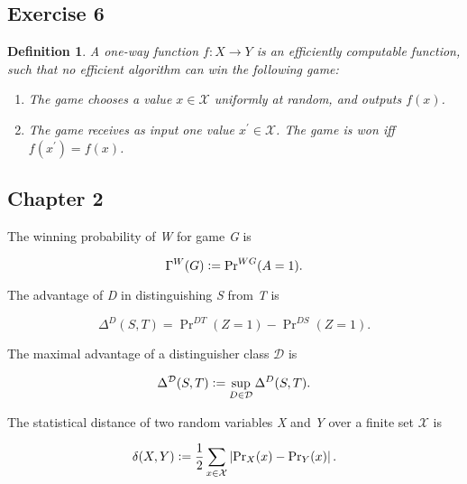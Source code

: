 \documentclass[a4paper,german]{article}
\newtheorem{definition}{Definition}
\newenvironment{customdef}[1]{\renewcommand\theinnercustomdef{#1}\innercustomdef}{\endinnercustomdef}
\begin{document}
\subsection*{Exercise 6}
\begin{definition}
	A one-way function $f: X \rightarrow Y$ is an efficiently computable function, such that no efficient algorithm can win the following game:

	\begin{enumerate}

		\item  The game chooses a value $x \in \mathcal{X}$ uniformly at random, and outputs $f(x)$.
		\item  The game receives as input one value $x^\prime \in \mathcal{X}$. The game is won iff $f(x^\prime) = f(x)$.

	\end{enumerate}
\end{definition}

\subsection*{Chapter 2}

\begin{customdef}{2.1}
	The winning probability of \emph{W} for game \emph{G} is

	\[
		\Gamma^{W}(G) \vcentcolon= \Pr\nolimits^{WG}(A = 1)
	.\]

\end{customdef}

\begin{customdef}{2.2}
	The advantage of \emph{D} in distinguishing \emph{S} from \emph{T} is

	\[
		\Delta^D(S,T) = \Pr\nolimits^{DT} (Z = 1) - \Pr\nolimits^{DS}(Z = 1)
	.\]
\end{customdef}

\begin{customdef}{2.3}
	The maximal advantage of a distinguisher class $\mathcal{D}$ is

	\[
		\Delta^\mathcal{D}(S,T) \vcentcolon= \sup_{D \in \mathcal{D}}\Delta^D(S,T)
	.\]
\end{customdef}

\begin{customdef}{2.4}
	The statistical distance of two random variables \emph{X} and \emph{Y} over a finite set $\mathcal{X}$ is

	\[
		\delta(X,Y) \vcentcolon= \frac{1}{2} \sum\limits_{x \in \mathcal{X}} \left| \Pr\nolimits_X(x) - \Pr\nolimits_Y(x)\right|
	.\]
\end{customdef}
\end{document}
